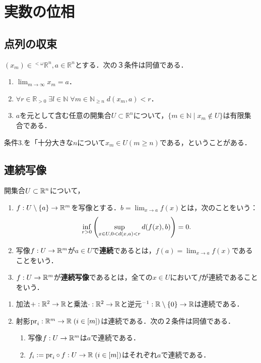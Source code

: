 \documentclass[uplatex,dvipdfmx]{jsreport}
\begin{document}
\section{実数の位相}

\subsection{点列の収束}

\begin{proposition}[点列の収束の位相的特徴付け]\label{prop-characterization-of-convergence-in-metric-spaces}
    $(x_m)\in{}^{<\omega}\mathbb{R}^n, a\in\mathbb{R}^n$とする．次の３条件は同値である．
    \begin{enumerate}
        \item $\lim_{m\to\infty}x_m=a$．
        \item $\forall r\in\mathbb{R}_{>0}\;\exists l\in\mathbb{N}\;\forall m\in\mathbb{N}_{\ge n}\; d(x_m,a)<r$．
        \item $a$を元として含む任意の開集合$U\subset\mathbb{R}^n$について，$\{m\in\mathbb{N}\mid x_m\notin U\}$は有限集合である．
    \end{enumerate}
    条件3.を「十分大きな$n$について$x_m\in U (m\ge n)$である，ということがある．
\end{proposition}

\subsection{連続写像}


\begin{definition}
    開集合$U\subset \mathbb{R}^n$について，
    \begin{enumerate}
        \item $f:U\setminus\{a\}\to\mathbb{R}^m$を写像とする．$b=\lim_{x\to a}f(x)$とは，次のことをいう：
        \[ \inf_{r>0}\left(\sup_{x\in U,\\0<d(x,a)<r}d(f(x),b)\right)=0. \]
        \item 写像$f:U\to\mathbb{R}^m$が$a\in U$で\textbf{連続}であるとは，$f(a)=\lim_{x\to a}f(x)$であることをいう．
        \item $f:U\to\mathbb{R}^m$が\textbf{連続写像}であるとは，全ての$x\in U$において$f$が連続であることをいう．
    \end{enumerate}
\end{definition}

\begin{proposition}\mbox{}
    \begin{enumerate}
        \item 加法$+:\mathbb{R}^2\to\mathbb{R}$と乗法$\cdot:\mathbb{R}^2\to\mathbb{R}$と逆元${}^{-1}:\mathbb{R}\setminus\{0\}\to\mathbb{R}$は連続である．
        \item 射影$\mathrm{pr}_i:\mathbb{R}^m\to\mathbb{R}\;(i\in[m])$は連続である．次の２条件は同値である．
        \begin{enumerate}[(1)]
            \item 写像$f:U\to\mathbb{R}^m$は$a$で連続である．
            \item $f_i:=\mathrm{pr}_i\circ f:U\to\mathbb{R}\;(i\in[m])$はそれぞれ$a$で連続である．
        \end{enumerate}
    \end{enumerate}
\end{proposition}
\end{document}
